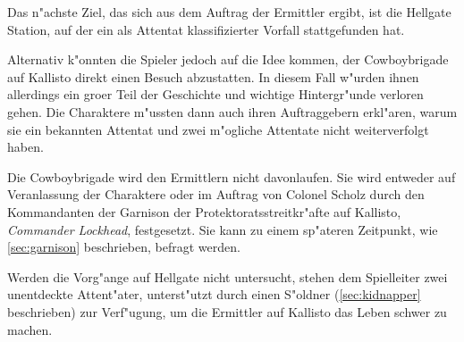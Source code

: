 
Das n"achste Ziel, das sich aus dem Auftrag der Ermittler ergibt, ist die Hellgate Station, auf der ein als Attentat klassifizierter Vorfall stattgefunden hat. 

Alternativ k"onnten die Spieler jedoch auf die Idee kommen, der Cowboybrigade auf Kallisto direkt einen Besuch abzustatten. In diesem Fall w"urden ihnen allerdings ein gro\3er Teil der Geschichte und wichtige Hintergr"unde verloren gehen. Die Charaktere m"ussten dann auch ihren Auftraggebern erkl"aren, warum sie ein bekannten Attentat und zwei m"ogliche Attentate nicht weiterverfolgt haben.

Die Cowboybrigade wird den Ermittlern nicht davonlaufen. Sie wird entweder auf Veranlassung der Charaktere oder im Auftrag von Colonel Scholz durch den Kommandanten der Garnison der Protektoratsstreitkr"afte auf Kallisto, \emph{Commander Lockhead}, festgesetzt. Sie kann zu einem sp"ateren Zeitpunkt, wie  \cref{sec:garnison} beschrieben, befragt werden.

Werden die Vorg"ange auf Hellgate nicht untersucht, stehen dem Spielleiter zwei unentdeckte Attent"ater, unterst"utzt durch einen S"oldner (\cref{sec:kidnapper} beschrieben) zur Verf"ugung, um die Ermittler auf Kallisto das Leben schwer zu machen.
\vfill
